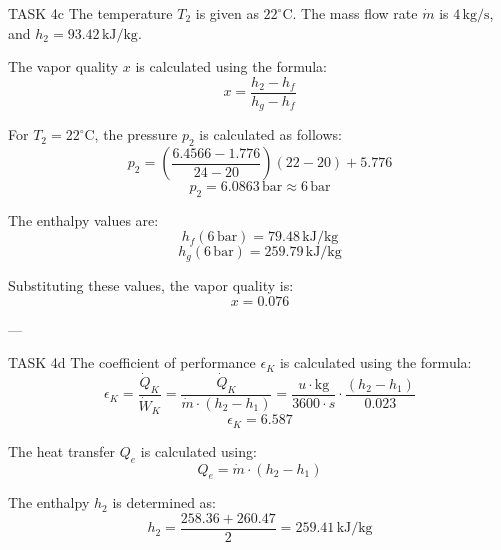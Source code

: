 TASK 4c  
The temperature \( T_2 \) is given as \( 22^\circ\text{C} \). The mass flow rate \( \dot{m} \) is \( 4 \, \text{kg/s} \), and \( h_2 = 93.42 \, \text{kJ/kg} \).  

The vapor quality \( x \) is calculated using the formula:  
\[
x = \frac{h_2 - h_f}{h_g - h_f}
\]  

For \( T_2 = 22^\circ\text{C} \), the pressure \( p_2 \) is calculated as follows:  
\[
p_2 = \left( \frac{6.4566 - 1.776}{24 - 20} \right)(22 - 20) + 5.776
\]  
\[
p_2 = 6.0863 \, \text{bar} \approx 6 \, \text{bar}
\]  

The enthalpy values are:  
\[
h_f(6 \, \text{bar}) = 79.48 \, \text{kJ/kg}
\]  
\[
h_g(6 \, \text{bar}) = 259.79 \, \text{kJ/kg}
\]  

Substituting these values, the vapor quality is:  
\[
x = 0.076
\]  

---

TASK 4d  
The coefficient of performance \( \epsilon_K \) is calculated using the formula:  
\[
\epsilon_K = \frac{\dot{Q}_K}{\dot{W}_K} = \frac{\dot{Q}_K}{\dot{m} \cdot (h_2 - h_1)} = \frac{u \cdot \text{kg}}{3600 \cdot s} \cdot \frac{(h_2 - h_1)}{0.023}
\]  
\[
\epsilon_K = 6.587
\]  

The heat transfer \( Q_e \) is calculated using:  
\[
Q_e = \dot{m} \cdot (h_2 - h_1)
\]  

The enthalpy \( h_2 \) is determined as:  
\[
h_2 = \frac{258.36 + 260.47}{2} = 259.41 \, \text{kJ/kg}
\]  


